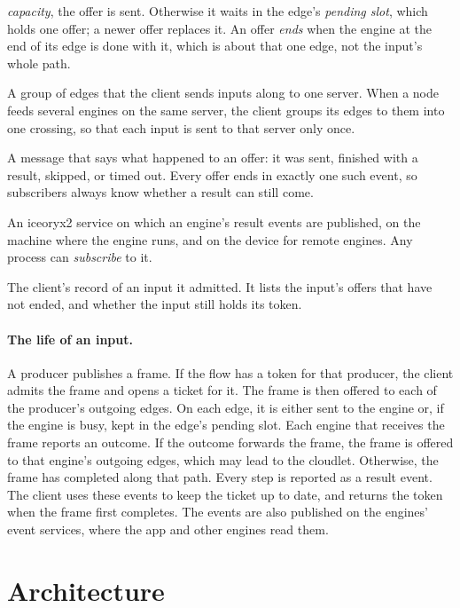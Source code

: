 \documentclass[11pt]{article}
\begin{document}
\begin{description}[style=nextline, nosep, leftmargin=1.5em]
        \emph{capacity}, the offer is sent. Otherwise it waits in the edge's
        \emph{pending slot}, which holds one offer; a newer offer replaces it.
        An offer \emph{ends} when the engine at the end of its edge is done
        with it, which is about that one edge, not the input's whole path.
  \item[Crossing] A group of edges that the client sends inputs along to
        one server. When a node feeds several engines on the same server, the
        client groups its edges to them into one crossing, so that each input
        is sent to that server only once.
  \item[Result event] A message that says what happened to an offer: it was
        sent, finished with a result, skipped, or timed out. Every offer ends
        in exactly one such event, so subscribers always know whether a result
        can still come.
  \item[Event service] An iceoryx2 service on which an engine's result events
        are published, on the machine where the engine runs, and on the device
        for remote engines. Any process can \emph{subscribe} to it.
  \item[Ticket] The client's record of an input it admitted. It lists the
        input's offers that have not ended, and whether the input still holds
        its token.
\end{description}

\paragraph{The life of an input.} A producer publishes a frame. If the
flow has a token for that producer, the client admits the frame and opens a
ticket for it. The frame is then offered to each of the producer's outgoing
edges. On each edge, it is either sent to the engine or, if the engine is
busy, kept in the edge's pending slot. Each engine that receives the frame
reports an outcome. If the outcome forwards the frame, the frame is offered to
that engine's outgoing edges, which may lead to the cloudlet. Otherwise, the
frame has completed along that path. Every step is reported as a result
event. The client uses these events to keep the ticket up to date, and returns
the token when the frame first completes. The events are also published on
the engines' event services, where the app and other engines read them.

\section{Architecture}
\label{sec:arch}
\end{document}
